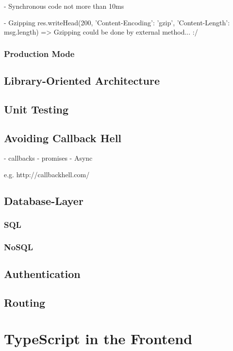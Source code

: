 \documentclass[12pt,a4paper]{report}
\begin{document}
- Synchronous code not more than 10ms

- Gzipping res.writeHead(200, {'Content-Encoding': 'gzip', 'Content-Length': msg.length}) => Gzipping could be done by external method... :/

\subsection{Production Mode}

\section{Library-Oriented Architecture}

\section{Unit Testing}

\section{Avoiding Callback Hell}

- callbacks
- promises
- Async

e.g. http://callbackhell.com/



\section{Database-Layer}

\subsection{SQL}

\subsection{NoSQL}

\section{Authentication}

\section{Routing}


\chapter{TypeScript in the Frontend}
\end{document}
